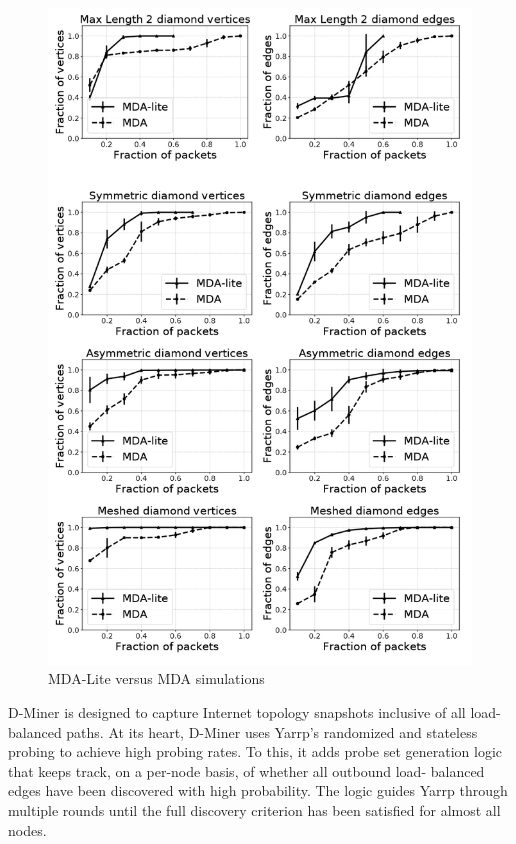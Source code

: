 \begin{figure}[h!!]
  \begin{center}
    \includegraphics[scale=0.3]{images/MDA_lite.png}
    \caption{MDA-Lite versus MDA simulations\cite{MDA-lite}}
    \label{figure:MDA_lite_fig}
  \end{center}
\end{figure}

D-Miner is designed to capture Internet topology snapshots
inclusive of all load-balanced paths. At its heart, D-Miner
uses Yarrp’s randomized and stateless probing to achieve high
probing rates. To this, it adds probe set generation logic that
keeps track, on a per-node basis, of whether all outbound load-
balanced edges have been discovered with high probability.
The logic guides Yarrp through multiple rounds until the full
discovery criterion has been satisfied for almost all nodes. \cite{diamond-miner}

